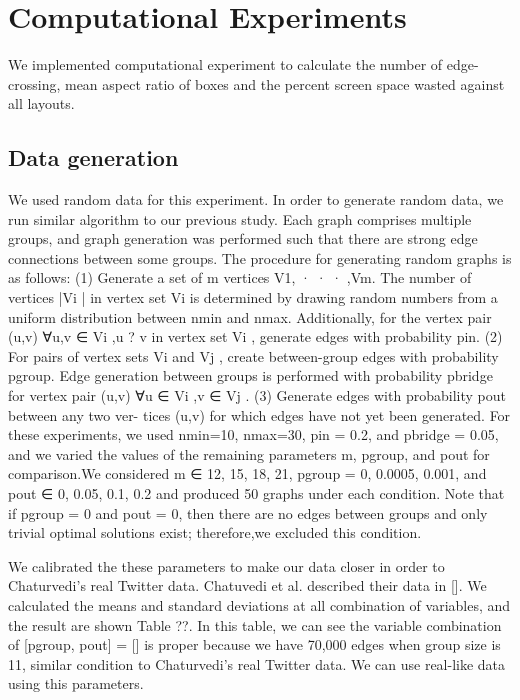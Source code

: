 \documentclass{llncs}
\begin{document}
%
\section{Computational Experiments}
%

We implemented computational experiment to calculate the number of edge-crossing, mean aspect ratio of boxes and the percent screen space wasted against all layouts.

\subsection{Data generation} 
We used random data for this experiment. In order to generate random data, we run similar algorithm to our previous study. Each graph comprises multiple groups, and graph generation was performed such that there are strong edge connections between some groups. The procedure for generating random graphs is as follows:
(1) Generate a set of m vertices {V1, · · · ,Vm}. The number of vertices |Vi | in vertex set Vi is determined by drawing random numbers from a uniform distribution between nmin and nmax.
Additionally, for the vertex pair (u,v) ∀u,v ∈ Vi ,u ? v in vertex set Vi , generate edges with probability pin.
(2) For pairs of vertex sets Vi and Vj , create between-group edges with probability pgroup. Edge generation between groups is
performed with probability pbridge for vertex pair (u,v) ∀u ∈ Vi ,v ∈ Vj .
(3) Generate edges with probability pout between any two ver- tices (u,v) for which edges have not yet been generated.
For these experiments, we used nmin=10, nmax=30, pin = 0.2, and pbridge = 0.05, and we varied the values of the remaining parameters m, pgroup, and pout for comparison.We considered m ∈ {12, 15, 18, 21}, pgroup = {0, 0.0005, 0.001}, and pout ∈ {0, 0.05, 0.1, 0.2} and produced 50 graphs under each condition. Note that if pgroup = 0 and pout = 0, then there are no edges between groups and only trivial optimal solutions exist; therefore,we excluded this condition.

We calibrated the these parameters to make our data closer in order to Chaturvedi's real Twitter data. Chatuvedi et al. described their data in []. We calculated the means and standard deviations at all combination of variables, and the result are shown Table ??. In this table, we can see the variable combination of [pgroup, pout] = [] is proper because we have 70,000 edges when group size is 11, similar condition to Chaturvedi's real Twitter data. We can use real-like data using this parameters.
\end{document}
